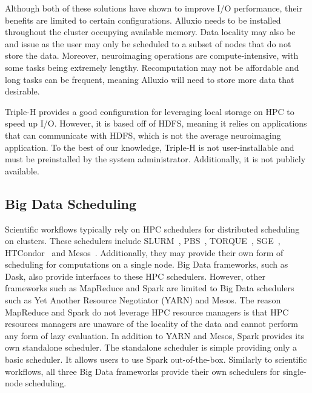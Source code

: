                 Although both of these solutions have shown to improve I/O
                performance, their benefits are limited to certain
                configurations. Alluxio needs to be installed throughout the
                cluster occupying available memory. Data locality may also be
                and issue as the user may only be scheduled to a subset of nodes
                that do not store the data. Moreover, neuroimaging operations
                are compute-intensive, with some tasks being extremely lengthy.
                Recomputation may not be affordable and long tasks can be
                frequent, meaning Alluxio will need to store more data that
                desirable.

                Triple-H provides a good configuration for leveraging local storage on HPC to speed up
                I/O. However, it is based off of HDFS, meaning it relies on applications that can communicate with
                HDFS, which is not the average neuroimaging application. To the best of
                our knowledge, Triple-H is not user-installable and must be preinstalled
                by the system administrator. Additionally, it is not publicly available.
                
                
        \subsection{Big Data Scheduling}\label{sched}
            
            Scientific workflows typically rely on HPC schedulers for
            distributed scheduling on clusters. These schedulers include
            SLURM~\cite{yoo2003slurm}, PBS~\cite{10.1007/3-540-60153-8_34},
            TORQUE~\cite{computing2015torque}, SGE~\cite{SGE},
            HTCondor~\cite{htcondor} and Mesos~\cite{hindman2011mesos}.
            Additionally, they may provide their own form of scheduling for
            computations on a single node. Big Data frameworks, such as Dask,
            also provide interfaces to these HPC schedulers. However, other
            frameworks such as MapReduce and Spark are limited to Big Data
            schedulers such as Yet Another Resource Negotiator (YARN) and Mesos.
            The reason MapReduce and Spark do not leverage HPC resource managers
            is that HPC resources managers are unaware of the locality of the
            data and cannot perform any form of lazy evaluation. In addition to
            YARN and Mesos, Spark provides its own standalone scheduler. The
            standalone scheduler is simple providing only a basic scheduler. It
            allows users to use Spark out-of-the-box. Similarly to scientific
            workflows, all three Big Data frameworks provide their own
            schedulers for single-node scheduling.

